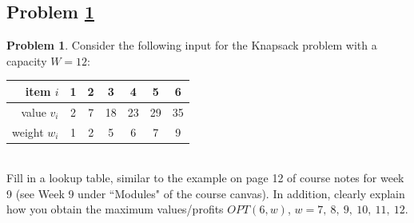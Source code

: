 \documentclass[11pt]{article}
\theoremstyle{definition}
\theoremstyle{definition}
\newtheorem{required}{Problem}
\theoremstyle{definition}
\begin{document}
\subsection{Problem \ref{Recurrence2}}
\begin{required} \label{Recurrence2}
Consider the following input for the Knapsack problem with a capacity $W=12$:\\

 \begin{tabular}{r|c|c|c|c|c|c}
        item $i$  & 1  & 2 &3 &4 &5 &6 \\
                \hline
        value $v_i$ &2 & 7& 18&23 &29 &35 \\
          \hline
        weight $w_i$ & 1 & 2  & 5& 6& 7& 9\\
                 \end{tabular}

\vspace{1mm}
\noindent \\ 
Fill in a lookup table, similar to the example on page 12 of course notes for week 9 (see Week 9 under ``Modules" of the course canvas). In addition, clearly explain how you obtain the maximum values/profits $OPT(6, w)$, $w=7,~8,~9,~10,~11,~12$.

\end{required}
\end{document}
